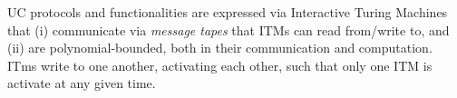 UC protocols and functionalities are expressed via Interactive Turing Machines that (i) communicate via \emph{message tapes} that ITMs can read from/write to,
and (ii) are polynomial-bounded, both in their communication and computation.
ITms write to one another, activating each other, such that only one ITM is activate at any given time.

